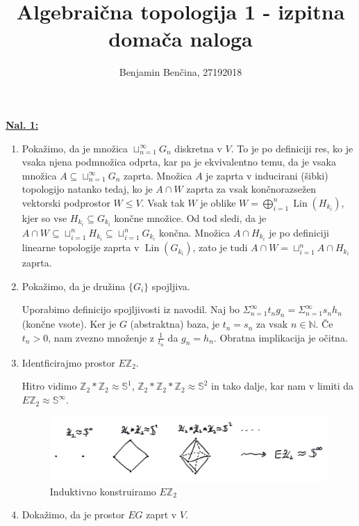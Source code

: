 \documentclass[a4paper, 12pt]{article}
\title{Algebraična topologija 1 - izpitna domača naloga}
\author{Benjamin Benčina, 27192018}
\DeclareMathOperator{\Lin}{Lin}
\renewcommand{\S}{\mathbb{S}}
\newcommand{\N}{\mathbb{N}}
\newcommand{\Z}{\mathbb{Z}}
\newcommand{\homeo}{\approx}
\begin{document}
\maketitle

\underline{\textbf{Nal. 1:}}
\begin{enumerate}[label=(\alph*)]
	\item Pokažimo, da je množica $\sqcup_{n=1}^\infty G_n$ diskretna v $V$. To je po definiciji res, ko je vsaka njena podmnožica odprta, kar pa je ekvivalentno temu, da je vsaka množica $A \subseteq \sqcup_{n=1}^\infty G_n$ zaprta. Množica $A$ je zaprta v inducirani (šibki) topologijo natanko tedaj, ko je $A \cap W$ zaprta za vsak končnorazsežen vektorski podprostor $W \leq V$. Vsak tak $W$ je oblike $W = \bigoplus_{i = 1}^n \Lin(H_{k_i})$, kjer so vse $H_{k_i} \subseteq G_{k_i}$ končne množice. Od tod sledi, da je $A \cap W \subseteq \sqcup_{i=1}^n H_{k_i} \subseteq \sqcup_{i=1}^n G_{k_i}$ končna. Množica $A \cap H_{k_i}$ je po definiciji linearne topologije zaprta v $\Lin(G_{k_i})$, zato je tudi $A \cap W = \sqcup_{i=1}^n A \cap H_{k_i}$ zaprta.
	
	\item Pokažimo, da je družina $\lbrace G_i \rbrace$ spojljiva.
	
	Uporabimo definicijo spojljivosti iz navodil. Naj bo $\Sigma_{n = 1}^\infty t_n g_n = \Sigma_{n = 1}^\infty s_n h_n$ (končne vsote). Ker je $G$ (abstraktna) baza, je $t_n = s_n$ za vsak $n \in \N$. Če $t_n > 0$, nam zvezno množenje z $\frac{1}{t_n}$ da $g_n = h_n$. Obratna implikacija je očitna.
	
	\item Identficirajmo prostor $E\Z_2$.
	
	Hitro vidimo $\Z_2 * \Z_2 \homeo \S^1$, $\Z_2 * \Z_2 * \Z_2 \homeo \S^2$ in tako dalje, kar nam v limiti da $E\Z_2 \homeo \S^\infty$.
	
	\begin{figure}[h]
		\centering
		\includegraphics[scale=0.3]{EZ1c.png}
		\caption{Induktivno konstruiramo $E\Z_2$}
		\label{fig:EZ2}
	\end{figure}
	
	\item Dokažimo, da je prostor $EG$ zaprt v $V$.
	

\end{enumerate}
\end{document}
